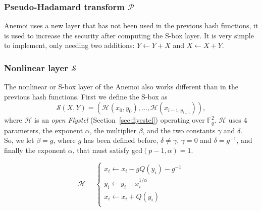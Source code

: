  \subsubsection*{Pseudo-Hadamard transform $\mathcal{P}$}
 Anemoi uses a new layer that has not been used in the previous hash functions, it is used to increase the security after computing the S-box layer. It is very simple to implement, only needing two additions: $Y\leftarrow Y+X$ and $X\leftarrow X+Y$.
 
 \subsubsection*{Nonlinear layer $\mathcal{S}$}
 The nonlinear or S-box layer of the Anemoi also works different than in the previous hash functions. First we define the S-box as
 \begin{equation}
    \mathcal{S}\left(X,Y\right)=\left(\mathcal{H}\left(x_0,y_0\right),\dots,\mathcal{H}\left(x_{l-1,y_{l-1}}\right)\right),
 \end{equation}
where $\mathcal{H}$ is an \textit{open Flystel} (Section~\ref{sec:flyestel}) operating over $\mathbb{F}_q^2$. $\mathcal{H}$ uses 4 parameters, the exponent $\alpha$, the multiplier $\beta$, and the two constants $\gamma$ and $\delta$.\\
So, we let $\beta=g$, where $g$ has been defined before, $\delta\neq\gamma$, $\gamma=0$ and $\delta=g^{-1}$, and finally the exponent $\alpha$, that must satisfy gcd$\left(p-1,\alpha\right)=1$.

\begin{equation}
    \mathcal{H} = 
    \begin{cases}
        x_i\longleftarrow x_i-gQ(y_i)-g^{-1}\\
        y_i\longleftarrow y_i-x_i^{1/\alpha}\\
        x_i\longleftarrow x_i+Q(y_i)\\
    \end{cases}
\end{equation}

